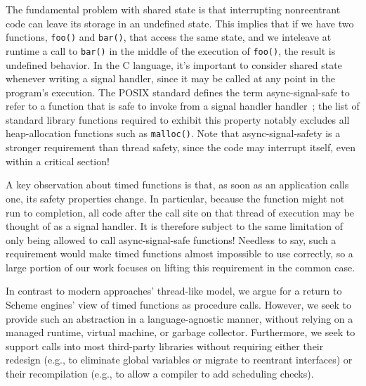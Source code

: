 The fundamental problem with shared state is that interrupting nonreentrant code can
leave its storage in an undefined state.  This implies that if we have two functions,
\texttt{foo()} and \texttt{bar()}, that access the same state, and we inteleave at
runtime a call to \texttt{bar()} in the middle of the execution of \texttt{foo()},
the result is undefined behavior.  In the C language, it's important to consider
shared state whenever writing a signal handler, since it may be called at any point
in the program's execution.  The POSIX standard defines the term async-signal-safe to
refer to a function that is safe to invoke from a signal handler
handler~\cite{signal-safety-manpage}; the list of standard library functions required
to exhibit this property notably excludes all heap-allocation functions such as
\texttt{malloc()}.  Note that async-signal-safety is a stronger requirement than
thread safety, since the code may interrupt itself, even within a critical section!

A key observation about timed functions is that, as soon as an application calls one,
its safety properties change.  In particular, because the function might not run to
completion, all code after the call site on that thread of execution may be thought
of as a signal handler.  It is therefore subject to the same limitation of only being
allowed to call async-signal-safe functions!  Needless to say, such a requirement
would make timed functions almost impossible to use correctly, so a large portion of
our work focuses on lifting this requirement in the common case.

In contrast to modern approaches' thread-like model, we argue for a return to Scheme
engines' view of timed functions as procedure calls.  However, we seek to provide
such an abstraction in a language-agnostic manner, without relying on a managed
runtime, virtual machine, or garbage collector.  Furthermore, we seek to support
calls into most third-party libraries without requiring either their redesign (e.g.,
to eliminate global variables or migrate to reentrant interfaces) or their
recompilation (e.g., to allow a compiler to add scheduling checks).
